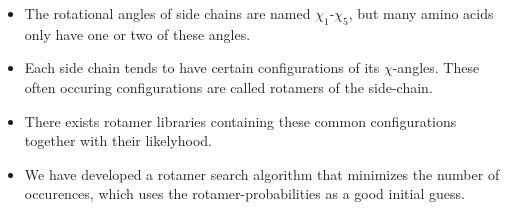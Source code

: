 \documentclass[a0,portrait]{a0poster}
\begin{document}
\begin{GridBlock}{51}{72.3}{48}
\begin{multicols}{2}
\begin{itemize}
\begin{minipage}{\linewidth}
\label{fig:lysine}
\end{minipage}
\vspace{1mm}
\item The rotational angles of side chains are named
  $\chi_1$-$\chi_5$, but many amino acids only have one or two of
  these angles.

\item Each side chain tends to have certain configurations of its
  $\chi$-angles. These often occuring configurations are called
  rotamers of the side-chain.

\item There exists rotamer libraries containing these common
  configurations together with their likelyhood.

\item We have developed a rotamer search algorithm that minimizes the
  number of occurences, which uses the rotamer-probabilities as a good
  initial guess.
\end{itemize}
\end{multicols}
\end{GridBlock}

\end{document}
